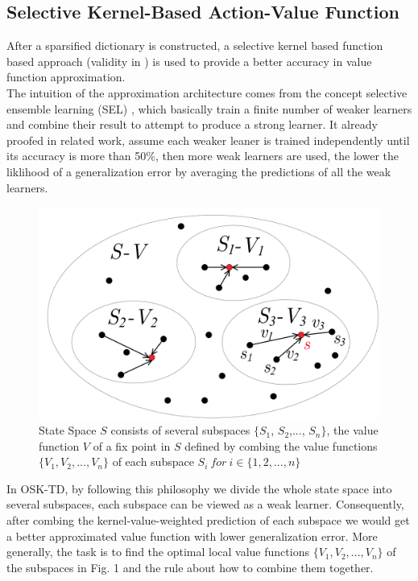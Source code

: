 \documentclass[conference]{IEEEtran}
\begin{document}
\subsection{Selective Kernel-Based Action-Value Function}
After a sparsified dictionary is constructed, a selective kernel based function based approach (validity in \cite{chen2013online}) is used to provide a better accuracy in value function approximation.\\

The intuition of the approximation architecture comes from the concept selective ensemble learning (SEL) \cite{hansen1990neural} \cite{liu1999ensemble}, which basically train a finite number of weaker learners and combine their result to attempt to produce a strong learner. It already proofed in related work, assume  each weaker leaner is trained independently until its accuracy is more than 50\%, then more weak learners are used, the lower the liklihood of a generalization error by averaging the predictions of all the weak learners. \\
\begin{figure}[ht]
	\centering
  \includegraphics[scale=0.1]{SEL.png}
	\caption{State Space $S$ consists of several subspaces $\{S_1$, $S_2$,..., $S_n\}$, the value function $V$ of a fix point in $S$ defined by combing the value functions $\{V_1, V_2,...,V_n\}$ of each subspace $S_i\ for\ i\in \{1, 2,..., n\}$}
	\label{fig1}
\end{figure}

In OSK-TD, by following this philosophy we divide the whole state space into several subspaces, each subspace can be viewed as a weak learner. Consequently, after combing the kernel-value-weighted prediction of each subspace we would get a better approximated value function with lower generalization error. More generally, the task is to find the optimal local value functions $\{V_1, V_2, ...,V_n\}$ of the subspaces in Fig. 1 and the rule about how to combine them together.\\
\end{document}
